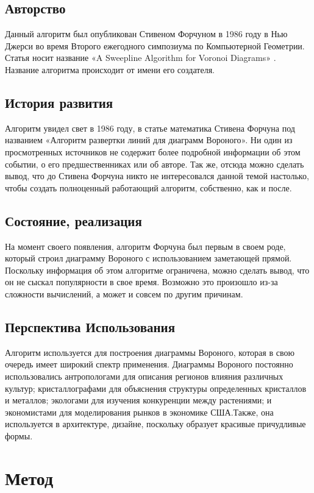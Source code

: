\documentclass[12 pt, a4paper]{article}
\begin{document}
\subsection{Авторство}
Данный алгоритм был опубликован Стивеном Форчуном в 1986 году в Нью Джерси во время Второго ежегодного симпозиума по Компьютерной Геометрии. Статья носит название «A Sweepline Algorithm for Voronoi Diagrams» . Название алгоритма происходит от имени его создателя.
\subsection{История развития}
Алгоритм увидел свет в 1986 году, в статье математика Стивена Форчуна под названием «Алгоритм развертки линий для диаграмм Вороного». Ни один из просмотренных источников не содержит более подробной информации об этом событии, о его предшественниках или об авторе. Так же, отсюда можно сделать вывод, что до Стивена Форчуна никто не интересовался данной темой настолько, чтобы создать полноценный работающий алгоритм, собственно, как и после.
\subsection{Состояние, реализация}
На момент своего появления, алгоритм Форчуна был первым в своем роде, который строил диаграмму Вороного с использованием заметающей прямой. Поскольку информация об этом алгоритме ограничена, можно сделать вывод, что он не сыскал популярности в свое время. Возможно это произошло из-за сложности вычислений, а может и совсем по другим причинам.
\subsection{Перспектива Использования}
Алгоритм используется для построения диаграммы Вороного, которая в свою очередь имеет широкий спектр применения. 
Диаграммы Вороного постоянно использовались антропологами для описания регионов влияния различных культур; кристаллографами для объяснения структуры определенных кристаллов и металлов; экологами для изучения конкуренции между растениями; и экономистами для моделирования рынков в экономике США.Также, она используется в архитектуре, дизайне, поскольку образует красивые причудливые формы. 
\newpage
\section{Метод}
\end{document}

